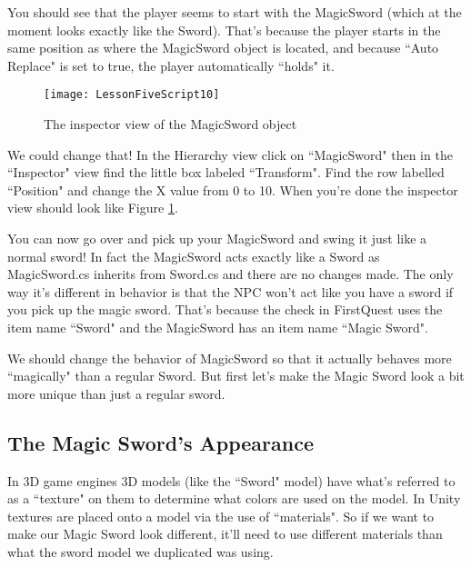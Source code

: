 \documentclass{article}
\begin{document}
\noindent{}

You should see that the player seems to start with the MagicSword (which at the moment looks exactly like the Sword). That's because the player starts in the same position as where the MagicSword object is located, and because ``Auto Replace" is set to true, the player automatically ``holds" it.

\begin{figure}
  \texttt{[image: LessonFiveScript10]}
  \caption{The inspector view of the MagicSword object}
  \label{fig:LessonFiveScript10}
\end{figure}

We could change that! In the Hierarchy view click on ``MagicSword" then in the ``Inspector" view find the little box labeled ``Transform". Find the row labelled ``Position" and change the X value from 0 to 10. When you're done the inspector view should look like Figure \ref{fig:LessonFiveScript10}.

\noindent{}

You can now go over and pick up your MagicSword and swing it just like a normal sword! In fact the MagicSword acts exactly like a Sword as MagicSword.cs inherits from Sword.cs and there are no changes made. The only way it's different in behavior is that the NPC won't act like you have a sword if you pick up the magic sword. That's because the check in FirstQuest uses the item name ``Sword" and the MagicSword has an item name ``Magic Sword".

We should change the behavior of MagicSword so that it actually behaves more ``magically" than a regular Sword. But first let's make the Magic Sword look a bit more unique than just a regular sword. 

\subsection{The Magic Sword's Appearance}

In 3D game engines 3D models (like the ``Sword" model) have what's referred to as a ``texture" on them to determine what colors are used on the model. In Unity textures are placed onto a model via the use of ``materials". So if we want to make our Magic Sword look different, it'll need to use different materials than what the sword model we duplicated was using. 
\end{document}
